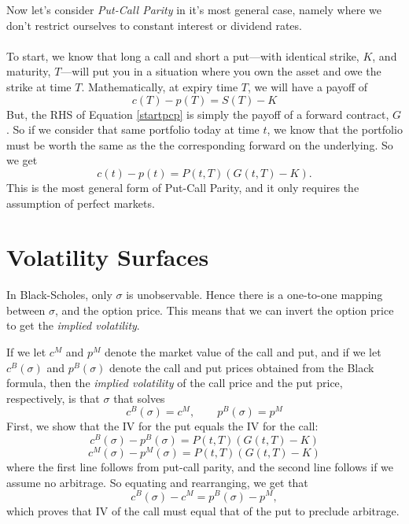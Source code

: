 \documentclass[12pt]{article}
\theoremstyle{plain}
\theoremstyle{definition}
\theoremstyle{remark}
\begin{document}
Now let's consider \emph{Put-Call Parity} in it's most general case,
namely where we don't restrict ourselves to constant interest or
dividend rates.
\\
\\
To start, we know that long a call and short a put---with identical
strike, $K$, and maturity, $T$---will put you
in a situation where you own the asset and owe the strike at time
$T$. Mathematically, at expiry time $T$, we will have a payoff of
\begin{equation}
   \label{startpcp}
   c(T)-p(T) = S(T) - K
\end{equation}
But, the RHS of Equation \ref{startpcp} is simply the payoff of a
forward contract, $G$.  So if we consider that same portfolio today 
at time $t$,
we know that the portfolio must be worth the same as the
the corresponding forward on the underlying. So we get
\begin{equation}
   \label{pcp}
   c(t) - p(t) = P(t,T) \left(G(t,T) - K\right).
\end{equation}
This is the most general form of Put-Call Parity, and it only 
requires the assumption of perfect markets.


\newpage

\section{Volatility Surfaces}

In Black-Scholes, only $\sigma$ is unobservable. Hence there is a
one-to-one mapping between $\sigma$, and the option price.
This means that we can invert the option price to get the
\emph{implied volatility}.

If we let $c^M$ and $p^M$ denote the market value of the call and
put, and if we let $c^B(\sigma)$ and $p^B(\sigma)$ denote the
call and put prices obtained from the Black formula, then the
\emph{implied volatility} of the call
price and the put price, respectively, is that 
$\sigma$ that solves
   \[ c^B(\sigma) = c^M, \qquad p^B(\sigma) = p^M  \]
First, we show that the IV for the put equals the IV for the
call:
   \[ c^B(\sigma) - p^B(\sigma) = P(t,T)(G(t,T) - K) \]
   \[ c^M(\sigma) - p^M(\sigma) = P(t,T)(G(t,T) - K) \]
where the first line follows from put-call parity, 
and the second line follows
if we assume no arbitrage.  So equating and rearranging, we get that
   \[ c^B(\sigma) - c^M = p^B(\sigma) - p^M,\]
which proves that IV of the call must equal that of the put to preclude 
arbitrage. 
\end{document}
